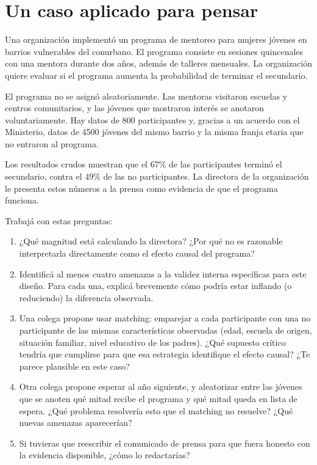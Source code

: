 \documentclass[
  letterpaper,
  DIV=11,
  numbers=noendperiod,
  oneside]{scrreprt}
\begin{document}
\hypertarget{un-caso-aplicado-para-pensar-2}{%
\section{Un caso aplicado para
pensar}\label{un-caso-aplicado-para-pensar-2}}

Una organización implementó un programa de mentoreo para mujeres jóvenes
en barrios vulnerables del conurbano. El programa consiste en sesiones
quincenales con una mentora durante dos años, además de talleres
mensuales. La organización quiere evaluar si el programa aumenta la
probabilidad de terminar el secundario.

El programa no se asignó aleatoriamente. Las mentoras visitaron escuelas
y centros comunitarios, y las jóvenes que mostraron interés se anotaron
voluntariamente. Hay datos de 800 participantes y, gracias a un acuerdo
con el Ministerio, datos de 4500 jóvenes del mismo barrio y la misma
franja etaria que no entraron al programa.

Los resultados crudos muestran que el 67\% de las participantes terminó
el secundario, contra el 49\% de las no participantes. La directora de
la organización le presenta estos números a la prensa como evidencia de
que el programa funciona.

Trabajá con estas preguntas:

\begin{enumerate}
\def\labelenumi{\arabic{enumi}.}
\item
  ¿Qué magnitud está calculando la directora? ¿Por qué no es razonable
  interpretarla directamente como el efecto causal del programa?
\item
  Identificá al menos cuatro amenazas a la validez interna específicas
  para este diseño. Para cada una, explicá brevemente cómo podría estar
  inflando (o reduciendo) la diferencia observada.
\item
  Una colega propone usar matching: emparejar a cada participante con
  una no participante de las mismas características observadas (edad,
  escuela de origen, situación familiar, nivel educativo de los padres).
  ¿Qué supuesto crítico tendría que cumplirse para que esa estrategia
  identifique el efecto causal? ¿Te parece plausible en este caso?
\item
  Otra colega propone esperar al año siguiente, y aleatorizar entre las
  jóvenes que se anoten qué mitad recibe el programa y qué mitad queda
  en lista de espera. ¿Qué problema resolvería esto que el matching no
  resuelve? ¿Qué nuevas amenazas aparecerían?
\item
  Si tuvieras que reescribir el comunicado de prensa para que fuera
  honesto con la evidencia disponible, ¿cómo lo redactarías?
\end{enumerate}
\end{document}
